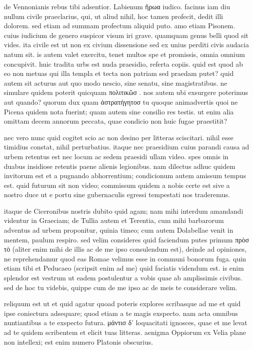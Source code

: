 


 de Vennonianis rebus tibi adsentior. Labienum ἥρωα iudico. facinus iam diu nullum civile praeclarius, qui, ut aliud nihil, hoc tamen profecit, dedit illi dolorem. sed etiam ad summam profectum aliquid puto. amo etiam Pisonem. cuius iudicium de genero suspicor visum iri grave. quamquam genus belli quod sit vides. ita civile est ut non ex civium dissensione sed ex unius perditi civis audacia natum sit. is autem valet exercitu, tenet multos spe et promissis, omnia omnium concupivit. huic tradita urbs est nuda praesidio, referta copiis. quid est quod ab eo non metuas qui illa templa et tecta non patriam sed praedam putet? quid autem sit acturus aut quo modo nescio, sine senatu, sine magistratibus. ne simulare quidem poterit quicquam πολιτικῶσ . nos autem ubi exsurgere poterimus aut quando? quorum dux quam ἀστρατήγητοσ tu quoque animadvertis quoi ne Picena quidem nota fuerint; quam autem sine consilio res testis. ut enim alia omittam decem annorum peccata, quae condicio non huic fugae praestitit?

 nec vero nunc quid cogitet scio ac non desino per litteras sciscitari. nihil esse timidius constat, nihil perturbatius. itaque nec praesidium cuius parandi causa ad urbem retentus est nec locum ac sedem praesidi ullam video. spes omnis in duabus insidiose retentis paene alienis legionibus. nam dilectus adhuc quidem invitorum est et a pugnando abhorrentium; condicionum autem amissum tempus est. quid futurum sit non video; commissum quidem a nobis certe est sive a nostro duce ut e portu sine gubernaculis egressi tempestati nos traderemus.

 itaque de Ciceronibus nostris dubito quid agam; nam mihi interdum amandandi videntur in Graeciam; de Tullia autem et Terentia, cum mihi barbarorum adventus ad urbem proponitur, quinia timeo; cum autem Dolabellae venit in mentem, paulum respiro. sed velim consideres quid faciendum putes primum πρὸσ τὸ (aliter enim mihi de illis ac de me ipso consulendum est), deinde ad opiniones, ne reprehendamur quod eas Romae velimus esse in communi bonorum fuga. quin etiam tibi et Peducaeo (scripsit enim ad me) quid faciatis videndum est. is enim splendor est vestrum ut eadem postulentur a vobis quae ab amplissimis civibus. sed de hoc tu videbis, quippe cum de me ipso ac de meis te considerare velim.

 reliquum est ut et quid agatur quoad poteris explores scribasque ad me et quid ipse coniectura adsequare; quod etiam a te magis exspecto. nam acta omnibus nuntiantibus a te exspecto futura. μάντισ δ' loquacitati ignosces, quae et me levat ad te quidem scribentem et elicit tuas litteras. aenigma Oppiorum ex Velia plane non intellexi; est enim numero Platonis obscurius.
